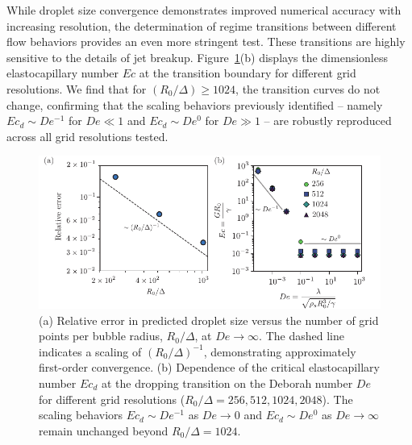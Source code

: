 \documentclass{jfm}
\newcommand{\oo}{\color{black} \normalfont}
\newcommand{\bb}{\color{black} \normalfont}
\begin{document}
While droplet size convergence demonstrates improved numerical accuracy with increasing resolution, the determination of regime transitions between different flow behaviors provides an even more stringent test. These transitions are highly sensitive to the details of jet breakup. Figure~\ref{fig:gis}(b) displays the dimensionless elastocapillary number $Ec$ at the transition boundary for different grid resolutions. We find that for $(R_0/\Delta) \geq 1024$, the transition curves do not change, confirming that the scaling behaviors previously identified -- namely $Ec_d \sim De^{-1}$ for $De \ll 1$ and $Ec_d \sim De^0$ for $De \gg 1$ -- are robustly reproduced across all grid resolutions tested.

\begin{figure}
	\centering
	\includegraphics[width=\textwidth]{gridConverge-eps-converted-to.pdf}
	\caption{{\oo (a) Relative error in predicted droplet size versus the number of grid points per bubble radius, $R_0/\Delta$, at $De \to \infty$. The dashed line indicates a scaling of $(R_0/\Delta)^{-1}$, demonstrating approximately first-order convergence. (b) Dependence of the critical elastocapillary number $Ec_d$ at the dropping transition on the Deborah number $De$ for different grid resolutions ($R_0/\Delta = 256, 512, 1024, 2048$). The scaling behaviors $Ec_d \sim De^{-1}$ as $De \to 0$ and $Ec_d \sim De^0$ as $De \to \infty$ remain unchanged beyond $R_0/\Delta = 1024$.\bb}}
	\label{fig:gis}
\end{figure}
\end{document}
